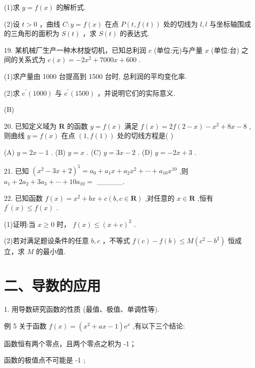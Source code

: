 \documentclass[10pt]{article}
\newcommand*\circled[1]{\tikz[baseline=(char.base)]{\node[shape=circle,draw,inner sep=1.5pt] (char) {\small #1};}}
\begin{document}
(1)求 \(y = f\left( x\right)\) 的解析式.

(2)设 \(t > 0\) ，曲线 \(C : y = f\left( x\right)\) 在点 \(P\left( {t,f\left( t\right) }\right)\) 处的切线为 \(l,l\) 与坐标轴围成的三角形的面积为 \(S\left( t\right)\) ，求 \(S\left( t\right)\) 的表达式.

19. 某机械厂生产一种木材旋切机，已知总利润 \(c\) (单位:元)与产量 \(x\) (单位:台) 之间的关系式为 \(c\left( x\right)  =  - 2{x}^{2} + {7000x} + {600}\) .

(1)求产量由 1000 台提高到 1500 台时, 总利润的平均变化率.

(2)求 \({c}^{\prime }\left( {1000}\right)\) 与 \({c}^{\prime }\left( {1500}\right)\) ，并说明它们的实际意义.

(B)

20. 已知定义域为 \(\mathbf{R}\) 的函数 \(y = f\left( x\right)\) 满足 \(f\left( x\right)  = {2f}\left( {2 - x}\right)  - {x}^{2} + {8x} - 8\) ,则曲线 \(y = f\left( x\right)\) 在点 \(\left( {1,f\left( 1\right) }\right)\) 处的切线方程是( )

(A) \(y = {2x} - 1\) . (B) \(y = x\) . (C) \(y = {3x} - 2\) . (D) \(y =  - {2x} + 3\) .

21. 已知 \({\left( {x}^{2} - 3x + 2\right) }^{5} = {a}_{0} + {a}_{1}x + {a}_{2}{x}^{2} + \cdots  + {a}_{10}{x}^{10}\) ,则 \({a}_{1} + 2{a}_{2} + 3{a}_{3} + \cdots  + {10}{a}_{10} =\) \_\_\_\_\_.

22. 已知函数 \(f\left( x\right)  = {x}^{2} + {bx} + c\left( {b,c \in  \mathbf{R}}\right)\) ,对任意的 \(x \in  \mathbf{R}\) ,恒有 \({f}^{\prime }\left( x\right)  \leq  f\left( x\right)\) .

(1)证明:当 \(x \geq  0\) 时， \(f\left( x\right)  \leq  {\left( x + c\right) }^{2}\) .

(2)若对满足题设条件的任意 \(b,c\) ，不等式 \(f\left( c\right)  - f\left( b\right)  \leq  M\left( {{c}^{2} - {b}^{2}}\right)\) 恒成立，求 \(M\) 的最小值.

\section*{二、导数的应用}

1. 用导数研究函数的性质 (最值、极值、单调性等).

例 5 关于函数 \(f\left( x\right)  = \left( {{x}^{2} + {ax} - 1}\right) {\mathrm{e}}^{x}\) ,有以下三个结论:

 \circled{1} 函数恒有两个零点，且两个零点之积为 -1；

 \circled{2} 函数的极值点不可能是 -1 ;
\end{document}
